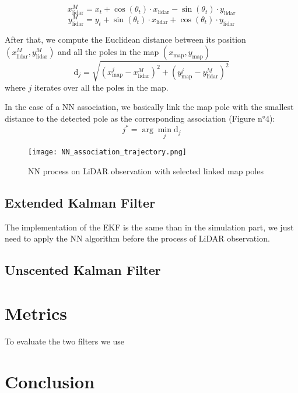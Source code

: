 \documentclass[conference]{IEEEtran}
\begin{document}
\[
x_{\text{lidar}}^{M} = x_t + \cos(\theta_t) \cdot x_{\text{lidar}} - \sin(\theta_t) \cdot y_{\text{lidar}}
\]
\[
y_{\text{lidar}}^{M} = y_t + \sin(\theta_t) \cdot x_{\text{lidar}} + \cos(\theta_t) \cdot y_{\text{lidar}}
\]

\noindent After that, we compute the Euclidean distance between its position \((x_{\text{lidar}}^{M}, y_{\text{lidar}}^{M})\) and all the poles in the map \((x_{\text{map}}, y_{\text{map}})\)
\[
\text{d}_{j} = \sqrt{(x_{\text{map}}^j - x_{\text{lidar}}^{M})^2 + (y_{\text{map}}^j - y_{\text{lidar}}^{M})^2}
\]
where \(j\) iterates over all the poles in the map.

\vspace{2mm}

\noindent In the case of a NN association, we basically link the map pole with the smallest distance to the detected pole as the corresponding association (Figure n°4):
\[
j^* = \arg\min_j \text{d}_j
\]

\begin{figure}[H]
    \centering
    \texttt{[image: NN\_association\_trajectory.png]}
    \caption{NN process on LiDAR observation with selected linked map poles}
    \label{fig:enter-label}
\end{figure}


\subsection{Extended Kalman Filter}

The implementation of the EKF is the same than in the simulation part, we just need to apply the NN algorithm before the process of LiDAR observation.



\subsection{Unscented Kalman Filter}

\section{Metrics}

To evaluate the two filters we use 

\section{Conclusion}
\end{document}
